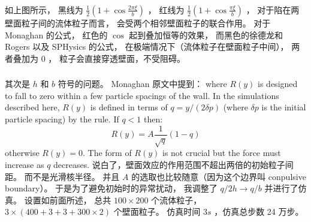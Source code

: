 \begin{frame}
    \frametitle{\subsecname}
    \begin{figure}[H]
        \centering
    \end{figure}
    如上图所示，
    黑线为 $\frac{1}{2}\left(1+\cos \frac{2\pi\xi}{b}\right)$ ，
    红线为 $\frac{1}{2}\left(1+\cos \frac{\pi\xi}{b}\right)$ ，
    对于陷在两壁面粒子间的流体粒子而言，
    会受两个相邻壁面粒子的联合作用。
    对于 Monaghan 的公式，
    红色的 $\cos$ 起到叠加恒等的效果，
    而黑色的徐德龙和 Rogers 以及 SPHysics 的公式，
    在极端情况下（流体粒子在壁面粒子中间），
    两者叠加为 $0$ ，
    粒子会直接穿透壁面，不受阻碍。
\end{frame}

\begin{frame}
    \frametitle{\subsecname}
    其次是 $h$ 和 $b$ 符号的问题。
    Monaghan 原文中提到：
    where $R( y)$ is designed to fall to zero within a few particle spacings of the wall. 
    In the simulations described here, $R( y)$ is defined in terms of $q = y/(2\delta p)$ 
    (where $\delta p$ is the initial particle spacing) by the rule.
    If $q<1$ then:
    \begin{equation}
        R(y)=A\frac{1}{\sqrt{q}}(1-q)
    \end{equation}
    otherwise $R(y)=0$.
    The form of $R( y)$ is not crucial but the force must increase as $q$ decreases.
    说白了，壁面效应的作用范围不超出两倍的初始粒子间距。
    而不是光滑核半径。
    并且 $A$ 的选取也比较随意（因为这个边界叫 conpulsive boundary）。
    于是为了避免初始时的异常扰动，
    我调整了 $q/2h\to q/b$
    并进行了仿真。
    设置如前面所述，
    总共 $100\times 200$ 个流体粒子，
    $3\times (400+3+3+300\times 2)$ 个壁面粒子。
    仿真时间 $3s$ ，仿真总步数 24 万步。
\end{frame}

